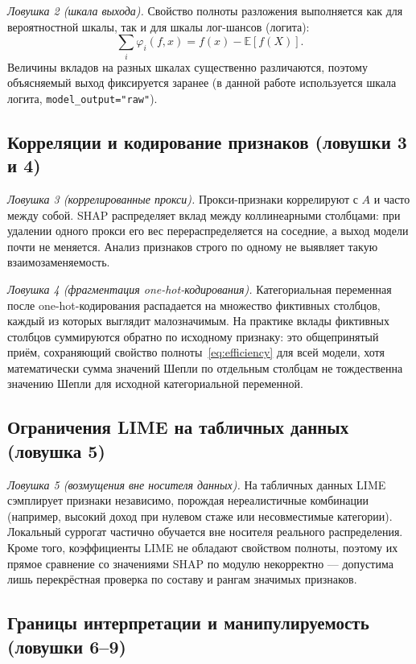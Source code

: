 \documentclass{misisarticle}
\begin{document}
\emph{Ловушка 2 (шкала выхода).} Свойство полноты разложения выполняется как для вероятностной шкалы, так и для шкалы лог-шансов (логита):
\begin{equation}
\sum_{i} \varphi_i(f, x) = f(x) - \mathbb{E}[f(X)].
\label{eq:efficiency}
\end{equation}
Величины вкладов на разных шкалах существенно различаются, поэтому объясняемый выход фиксируется заранее (в данной работе используется шкала логита, \texttt{model\_output="raw"}).

\subsection{Корреляции и кодирование признаков (ловушки 3 и 4)}

\emph{Ловушка 3 (коррелированные прокси).} Прокси-признаки коррелируют с $A$ и часто между собой. SHAP распределяет вклад между коллинеарными столбцами: при удалении одного прокси его вес перераспределяется на соседние, а выход модели почти не меняется. Анализ признаков строго по одному не выявляет такую взаимозаменяемость.

\emph{Ловушка 4 (фрагментация one-hot-кодирования).} Категориальная переменная после one-hot-кодирования распадается на множество фиктивных столбцов, каждый из которых выглядит малозначимым. На практике вклады фиктивных столбцов суммируются обратно по исходному признаку: это общепринятый приём, сохраняющий свойство полноты~\eqref{eq:efficiency} для всей модели, хотя математически сумма значений Шепли по отдельным столбцам не тождественна значению Шепли для исходной категориальной переменной.

\subsection{Ограничения LIME на табличных данных (ловушка 5)}

\emph{Ловушка 5 (возмущения вне носителя данных).} На табличных данных LIME~\cite{ribeiro2016} сэмплирует признаки независимо, порождая нереалистичные комбинации (например, высокий доход при нулевом стаже или несовместимые категории). Локальный суррогат частично обучается вне носителя реального распределения. Кроме того, коэффициенты LIME не обладают свойством полноты, поэтому их прямое сравнение со значениями SHAP по модулю некорректно — допустима лишь перекрёстная проверка по составу и рангам значимых признаков.

\subsection{Границы интерпретации и манипулируемость (ловушки 6--9)}
\end{document}
